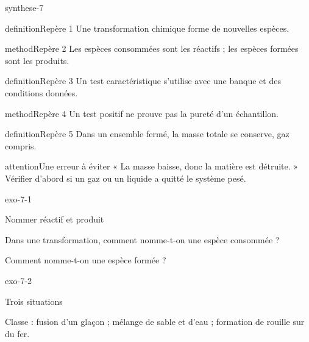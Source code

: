 \documentclass[12pt,twoside,openany]{book}
\begin{document}
\label{ch-7-bilan}
\begin{pcFiche}{synthese-7}
\begin{pcEncadre}{definition}{Repère 1}
Une transformation chimique forme de nouvelles espèces.\par
\end{pcEncadre}
\begin{pcEncadre}{method}{Repère 2}
Les espèces consommées sont les réactifs ; les espèces formées sont les produits.\par
\end{pcEncadre}
\begin{pcEncadre}{definition}{Repère 3}
Un test caractéristique s’utilise avec une banque et des conditions données.\par
\end{pcEncadre}
\begin{pcEncadre}{method}{Repère 4}
Un test positif ne prouve pas la pureté d’un échantillon.\par
\end{pcEncadre}
\begin{pcEncadre}{definition}{Repère 5}
Dans un ensemble fermé, la masse totale se conserve, gaz compris.\par
\end{pcEncadre}
\begin{pcEncadre}{attention}{Une erreur à éviter}
« La masse baisse, donc la matière est détruite. » Vérifier d’abord si un gaz ou un liquide a quitté le système pesé.\par
\end{pcEncadre}
\end{pcFiche}
\clearpage{}
\begin{blocLivre}{exo-7-1}
\begin{exercice}[1]{Nommer réactif et produit}
\begin{questions}
\item Dans une transformation, comment nomme-t-on une espèce consommée ?
\item Comment nomme-t-on une espèce formée ?
\end{questions}
\end{exercice}\end{blocLivre}
\begin{blocLivre}{exo-7-2}
\begin{exercice}[1]{Trois situations}
\begin{questions}
\item Classe : fusion d’un glaçon ; mélange de sable et d’eau ; formation de rouille sur du fer.
\end{questions}
\end{exercice}\end{blocLivre}
\end{document}
